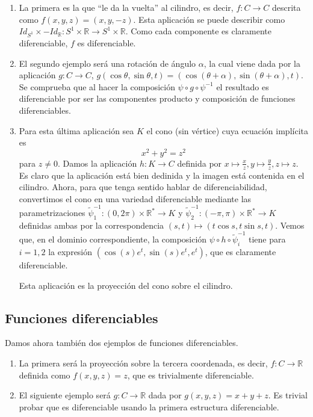 \documentclass[twoside, 11pt]{article}
\theoremstyle{definition}
\newcommand{\R}{\mathbb{R}}
\begin{document}
\begin{enumerate}


\item La primera es la que ``le da la vuelta'' al cilindro, es decir, $f:C\to C$ descrita como $f(x,y,z)=(x,y,-z)$. Esta aplicación se puede describir como $Id_{S^1}\times -Id_{\R}:S^1\times\R\to S^1\times\R$. Como cada componente es claramente diferenciable, $f$ es diferenciable. 

\item El segundo ejemplo será una rotación de ángulo $\alpha$, la cual viene dada por la aplicación $g:C\to C$, $g(\cos\theta,\sin\theta, t)=(\cos(\theta+\alpha), \sin(\theta+\alpha), t)$. Se comprueba que al hacer la composición $\psi\circ g\circ \psi^{-1}$ el resultado es diferenciable por ser las componentes producto y composición de funciones diferenciables. 

\item Para esta última aplicación sea $K$ el cono (sin vértice) cuya ecuación implícita es $$x^2+y^2=z^2$$ para $z\neq 0$. Damos la aplicación $h:K\to C$ definida por $x\mapsto \frac{x}{z}, y\mapsto \frac{y}{z}, z\mapsto z$. Es claro que la aplicación está bien dedinida y la imagen está contenida en el cilindro. Ahora, para que tenga sentido hablar de diferenciabilidad, convertimos el cono en una variedad diferenciable mediante las parametrizaciones $\widetilde{\psi}_1^{-1}:(0,2\pi)\times\R^*\to K$ y $\widetilde{\psi}_2^{-1}:(-\pi,\pi)\times\R^*\to K$ definidas ambas por la correspondencia $(s,t)\mapsto (t\cos s, t\sin s, t)$. Vemos que, en el dominio correspondiente, la composición $\psi\circ h\circ \widetilde{\psi}_i^{-1}$ tiene para $i=1,2$  la expresión $(\cos(s)e^t, \sin(s)e^t, e^t)$, que es claramente diferenciable. 

Esta aplicación es la proyección del cono sobre el cilindro. 


\end{enumerate}

\subsection{Funciones diferenciables}

Damos ahora también dos ejemplos de funciones diferenciables. 

\begin{enumerate}


\item
 La primera será la proyección sobre la tercera coordenada, es decir, $f:C\to\R$ definida como $f(x,y,z)=z$, que es trivialmente diferenciable. 

\item
 El siguiente ejemplo será $g:C\to\R$ dada por $g(x,y,z)=x+y+z$. Es trivial probar que es diferenciable usando la primera estructura diferenciable. 

\end{enumerate}
\end{document}
